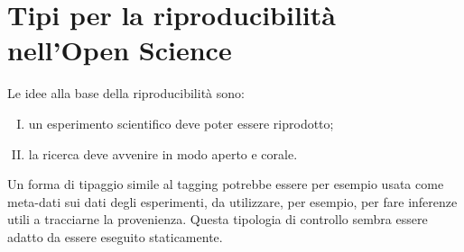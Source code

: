 \section{Tipi per la riproducibilità nell'Open Science}
Le idee alla base della riproducibilità sono: 
\begin{enumerate}[I)]
    \item un esperimento scientifico deve poter essere riprodotto; 
    \item la ricerca deve avvenire in modo aperto e corale. 
\end{enumerate}
Un forma di tipaggio simile al tagging potrebbe essere per esempio usata come meta-dati sui dati degli esperimenti, da utilizzare, per esempio, per 
fare inferenze utili a tracciarne la provenienza. Questa tipologia di controllo sembra essere adatto da essere eseguito staticamente.







